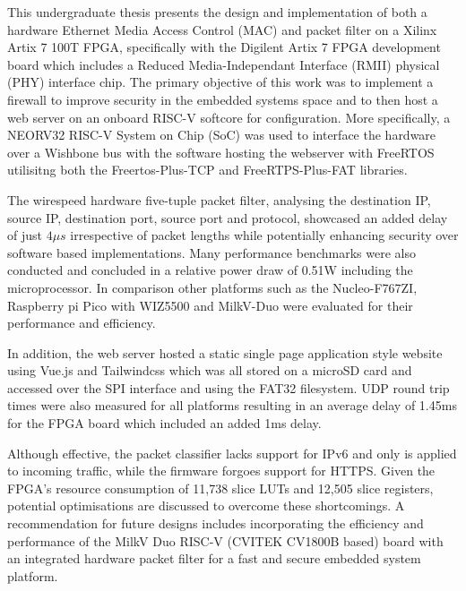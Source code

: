 

%

%





This undergraduate thesis presents the design and implementation of both a hardware Ethernet Media Access Control (MAC) and packet filter on a Xilinx Artix 7 100T FPGA, specifically with the Digilent Artix 7 FPGA development board which includes a Reduced Media-Independant Interface (RMII) physical (PHY) interface chip. The primary objective of this work was to implement a firewall to improve security in the embedded systems space and to then host a web server on an onboard RISC-V softcore for configuration. More specifically, a NEORV32 RISC-V System on Chip (SoC) was used to interface the hardware over a Wishbone bus with the software hosting the webserver with FreeRTOS utilisitng both the Freertos-Plus-TCP and FreeRTPS-Plus-FAT libraries. 

The wirespeed hardware five-tuple packet filter, analysing the destination IP, source IP, destination port, source port and protocol, showcased an added delay of just $4\mu s$ irrespective of packet lengths while potentially enhancing security over software based implementations. Many performance benchmarks were also conducted and concluded in a relative power draw of 0.51W including the microprocessor. In comparison other platforms such as the Nucleo-F767ZI, Raspberry pi Pico with WIZ5500 and MilkV-Duo were evaluated for their performance and efficiency.  

In addition, the web server hosted a static single page application style website using Vue.js and Tailwindcss which was all stored on a microSD card and accessed over the SPI interface and using the FAT32 filesystem. UDP round trip times were also measured for all platforms resulting in an average delay of 1.45ms for the FPGA board which included an added 1ms delay. 

Although effective, the packet classifier lacks support for IPv6 and only is applied to incoming traffic, while the firmware forgoes support for HTTPS. Given the FPGA's resource consumption of 11,738 slice LUTs and 12,505 slice registers, potential optimisations are discussed to overcome these shortcomings. A recommendation for future designs includes incorporating the efficiency and performance of the MilkV Duo RISC-V (CVITEK CV1800B based) board with an integrated hardware packet filter for a fast and secure embedded system platform. 

%